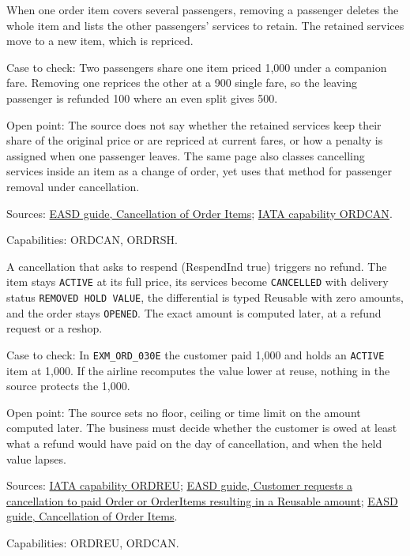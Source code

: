 \begin{definition}
  \label{def:change-cancellation-remove-passenger}
  \notready
  When one order item covers several passengers, removing a passenger
  deletes the whole item and lists the other passengers' services to retain.
  The retained services move to a new item, which is repriced.

  Case to check: Two passengers share one item priced 1,000 under a
  companion fare. Removing one reprices the other at a 900 single fare, so
  the leaving passenger is refunded 100 where an even split gives 500.

  Open point: The source does not say whether the retained services keep
  their share of the original price or are repriced at current fares, or how
  a penalty is assigned when one passenger leaves. The same page also
  classes cancelling services inside an item as a change of order, yet uses
  that method for passenger removal under cancellation.

  Sources: \href{https://standards.atlassian.net/wiki/spaces/EASD/pages/574783569}{EASD guide, Cancellation of Order Items};
  \href{https://retailing.iata.org/armi/docs/ORDCAN/}{IATA capability ORDCAN}.

  Capabilities: ORDCAN, ORDRSH.
\end{definition}

\begin{definition}
  \label{def:change-cancellation-reusable-amount}
  \notready
  A cancellation that asks to respend (RespendInd true) triggers no refund.
  The item stays \texttt{ACTIVE} at its full price, its services become
  \texttt{CANCELLED} with delivery status \texttt{REMOVED HOLD VALUE}, the
  differential is typed Reusable with zero amounts, and the order stays
  \texttt{OPENED}. The exact amount is computed later, at a refund request
  or a reshop.

  Case to check: In \texttt{EXM\_ORD\_030E} the customer paid 1,000 and
  holds an \texttt{ACTIVE} item at 1,000. If the airline recomputes the
  value lower at reuse, nothing in the source protects the 1,000.

  Open point: The source sets no floor, ceiling or time limit on the amount
  computed later. The business must decide whether the customer is owed at
  least what a refund would have paid on the day of cancellation, and when
  the held value lapses.

  Sources: \href{https://retailing.iata.org/armi/docs/ORDREU/}{IATA capability ORDREU};
  \href{https://standards.atlassian.net/wiki/spaces/EASD/pages/817594921}{EASD guide, Customer requests a cancellation to paid Order or OrderItems resulting in a Reusable amount};
  \href{https://standards.atlassian.net/wiki/spaces/EASD/pages/574783569}{EASD guide, Cancellation of Order Items}.

  Capabilities: ORDREU, ORDCAN.
\end{definition}

